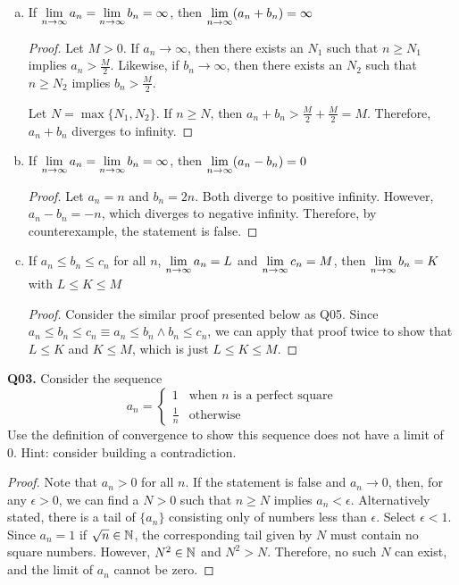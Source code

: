\documentclass[11pt]{article}
\begin{document}
\begin{enumerate}[(a)]

  \item If $\displaystyle\lim_{n\to\infty}a_n=\displaystyle\lim_{n\to\infty}b_n=\infty$, then $\displaystyle\lim_{n\to\infty}(a_n+b_n)=\infty$
        \begin{proof}
          Let $M>0$. If $a_n\to\infty$, then there exists an $N_1$ such that $n\geq N_1$ implies $a_n>\frac{M}{2}$. Likewise, if $b_n\to\infty$, then there exists an $N_2$ such that $n\geq N_2$ implies $b_n>\frac{M}{2}$.

          Let $N=\max \{N_1,N_2\}$. If $n\geq N$, then $a_n+b_n>\frac{M}{2}+\frac{M}{2}=M$.
          Therefore, $a_n+b_n$ diverges to infinity.
        \end{proof}

  \item If $\displaystyle\lim_{n\to\infty}a_n=\displaystyle\lim_{n\to\infty}b_n=\infty$, then $\displaystyle\lim_{n\to\infty}(a_n-b_n)=0$
        \begin{proof}
          Let $a_n=n$ and $b_n=2n$. Both diverge to positive infinity. However, $a_n-b_n=-n$, which diverges to negative infinity. Therefore, by counterexample, the statement is false.
        \end{proof}

  \item If $a_n \leq b_n \leq c_n$ for all $n$, $\displaystyle\lim_{n\to\infty}a_n=L$ and $\displaystyle\lim_{n\to\infty}c_n=M$, then $\displaystyle\lim_{n\to\infty}b_n=K$ with $L \leq K \leq M$
        \begin{proof}
          Consider the similar proof presented below as Q05.
          Since $a_n \leq b_n \leq c_n \equiv a_n \leq b_n \land b_n \leq c_n$, we can apply that proof twice to show that $L \leq K$ and $K \leq M$, which is just $L \leq K \leq M$.
        \end{proof}

\end{enumerate}



\textbf{Q03.}
Consider the sequence
\[
  a_n=\begin{cases}
    1           & \textrm{when $n$ is a perfect square} \\
    \frac{1}{n} & \textrm{otherwise}
  \end{cases}
\]
Use the definition of convergence to show this sequence does not have a limit of 0. Hint: consider building a contradiction.
\begin{proof}
  Note that $a_n>0$ for all $n$.
  If the statement is false and $a_n\to 0$, then, for any $\epsilon>0$, we can find a $N>0$ such that $n\geq N$ implies $a_n<\epsilon$.
  Alternatively stated, there is a tail of $\{a_n\}$ consisting only of numbers less than $\epsilon$.
  Select $\epsilon<1$. Since $a_n=1$ if $\sqrt{n}\in\mathbb{N}$, the corresponding tail given by $N$ must contain no square numbers.
  However, $N^2\in\mathbb{N}$ and $N^2>N$. Therefore, no such $N$ can exist, and the limit of $a_n$ cannot be zero.
\end{proof}
\end{document}
